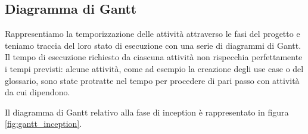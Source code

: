 \subsection{Diagramma di Gantt}

Rappresentiamo la temporizzazione delle attivit\`a attraverso le fasi del progetto e teniamo traccia del loro stato di esecuzione con una serie di diagrammi di Gantt.
Il tempo di esecuzione richiesto da ciascuna attivit\`a non rispecchia perfettamente i tempi previsti: alcune attivit\`a, come ad esempio la creazione degli use case o del glossario, sono state protratte nel tempo per procedere di pari passo con attivit\`a da cui dipendono.

Il diagramma di Gantt relativo alla fase di inception \`e rappresentato in figura \ref{fig:gantt_inception}.



